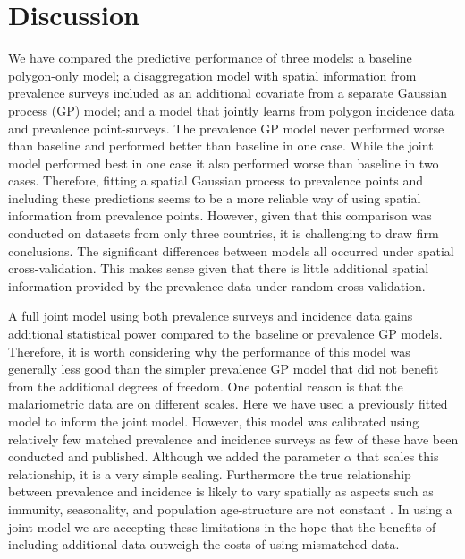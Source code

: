 \documentclass{statsoc}
\begin{document}
\section*{Discussion}



We have compared the predictive performance of three models: a baseline polygon-only model; a disaggregation model with spatial information from prevalence surveys included as an additional covariate from a separate Gaussian process (GP) model; and a model that jointly learns from polygon incidence data and prevalence point-surveys.
The prevalence GP model never performed worse than baseline and performed better than baseline in one case.
While the joint model performed best in one case it also performed worse than baseline in two cases.
Therefore, fitting a spatial Gaussian process to prevalence points and including these predictions seems to be a more reliable way of using spatial information from prevalence points.
However, given that this comparison was conducted on datasets from only three countries, it is challenging to draw firm conclusions.
The significant differences between models all occurred under spatial cross-validation.
This makes sense given that there is little additional spatial information provided by the prevalence data under random cross-validation.


A full joint model using both prevalence surveys and incidence data gains additional statistical power compared to the baseline or prevalence GP models.
Therefore, it is worth considering why the performance of this model was generally less good than the simpler prevalence GP model that did not benefit from the additional degrees of freedom.
One potential reason is that the malariometric data are on different scales.
Here we have used a previously fitted model \citep{cameron2015defining} to inform the joint model.
However, this model was calibrated using relatively few matched prevalence and incidence surveys as few of these have been conducted and published.
Although we added the parameter $\alpha$ that scales this relationship, it is a very simple scaling.
Furthermore the true relationship between prevalence and incidence is likely to vary spatially as aspects such as immunity, seasonality, and population age-structure are not constant \citep{cameron2015defining, battle2015defining, reiner2015seasonality}.
In using a joint model we are accepting these limitations in the hope that the benefits of including additional data outweigh the costs of using mismatched data.
\end{document}
